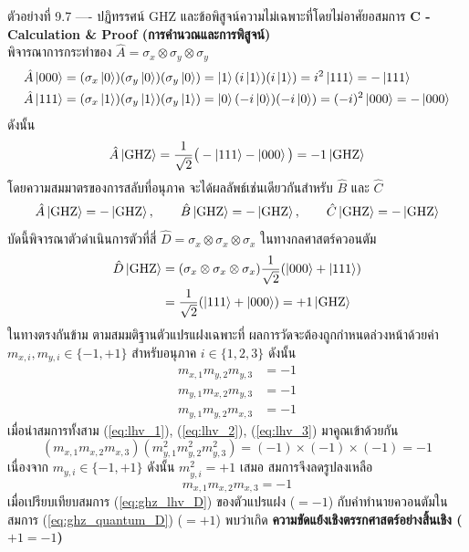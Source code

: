 \begin{psctbox}{ตัวอย่างที่ 9.7 ---- ปฏิทรรศน์ GHZ และข้อพิสูจน์ความไม่เฉพาะที่โดยไม่อาศัยอสมการ}
\vspace{4pt}
\noindent\textbf{C - Calculation \& Proof (การคำนวณและการพิสูจน์)} \\
พิจารณาการกระทำของ $\hat{A} = \sigma_x \otimes \sigma_y \otimes \sigma_y$
\begin{align}
\hat{A}\ket{000} &= (\sigma_x\ket{0})(\sigma_y\ket{0})(\sigma_y\ket{0}) = \ket{1}(i\ket{1})(i\ket{1}) = i^2 \ket{111} = -\ket{111} \\
\hat{A}\ket{111} &= (\sigma_x\ket{1})(\sigma_y\ket{1})(\sigma_y\ket{1}) = \ket{0}(-i\ket{0})(-i\ket{0}) = (-i)^2 \ket{000} = -\ket{000}
\end{align}
ดังนั้น
\begin{equation}
\hat{A}\ket{\text{GHZ}} = \frac{1}{\sqrt{2}} \big( -\ket{111} - \ket{000} \big) = -1 \ket{\text{GHZ}}
\end{equation}
โดยความสมมาตรของการสลับที่อนุภาค จะได้ผลลัพธ์เช่นเดียวกันสำหรับ $\hat{B}$ และ $\hat{C}$
\begin{equation}
\hat{A}\ket{\text{GHZ}} = -\ket{\text{GHZ}}, \qquad \hat{B}\ket{\text{GHZ}} = -\ket{\text{GHZ}}, \qquad \hat{C}\ket{\text{GHZ}} = -\ket{\text{GHZ}}
\end{equation}
บัดนี้พิจารณาตัวดำเนินการตัวที่สี่ $\hat{D} = \sigma_x \otimes \sigma_x \otimes \sigma_x$ ในทางกลศาสตร์ควอนตัม
\begin{align}
\hat{D} \ket{\text{GHZ}} &= (\sigma_x \otimes \sigma_x \otimes \sigma_x) \frac{1}{\sqrt{2}}(\ket{000}+\ket{111}) \nonumber \\
&= \frac{1}{\sqrt{2}}(\ket{111}+\ket{000}) = +1 \ket{\text{GHZ}}
\label{eq:ghz_quantum_D}
\end{align}
ในทางตรงกันข้าม ตามสมมติฐานตัวแปรแฝงเฉพาะที่ ผลการวัดจะต้องถูกกำหนดล่วงหน้าด้วยค่า $m_{x,i}, m_{y,i} \in \{-1, +1\}$ สำหรับอนุภาค $i \in \{1, 2, 3\}$ ดังนั้น
\begin{align}
m_{x,1} m_{y,2} m_{y,3} &= -1 \label{eq:lhv_1} \\
m_{y,1} m_{x,2} m_{y,3} &= -1 \label{eq:lhv_2} \\
m_{y,1} m_{y,2} m_{x,3} &= -1 \label{eq:lhv_3}
\end{align}
เมื่อนำสมการทั้งสาม (\ref{eq:lhv_1}), (\ref{eq:lhv_2}), (\ref{eq:lhv_3}) มาคูณเข้าด้วยกัน
\begin{equation}
(m_{x,1} m_{x,2} m_{x,3}) (m_{y,1}^2 m_{y,2}^2 m_{y,3}^2) = (-1) \times (-1) \times (-1) = -1
\end{equation}
เนื่องจาก $m_{y,i} \in \{-1, +1\}$ ดังนั้น $m_{y,i}^2 = +1$ เสมอ สมการจึงลดรูปลงเหลือ
\begin{equation}
m_{x,1} m_{x,2} m_{x,3} = -1
\label{eq:ghz_lhv_D}
\end{equation}
เมื่อเปรียบเทียบสมการ (\ref{eq:ghz_lhv_D}) ของตัวแปรแฝง ($=-1$) กับคำทำนายควอนตัมในสมการ (\ref{eq:ghz_quantum_D}) ($=+1$) พบว่าเกิด \textbf{ความขัดแย้งเชิงตรรกศาสตร์อย่างสิ้นเชิง ($+1 = -1$)}


\end{psctbox}
